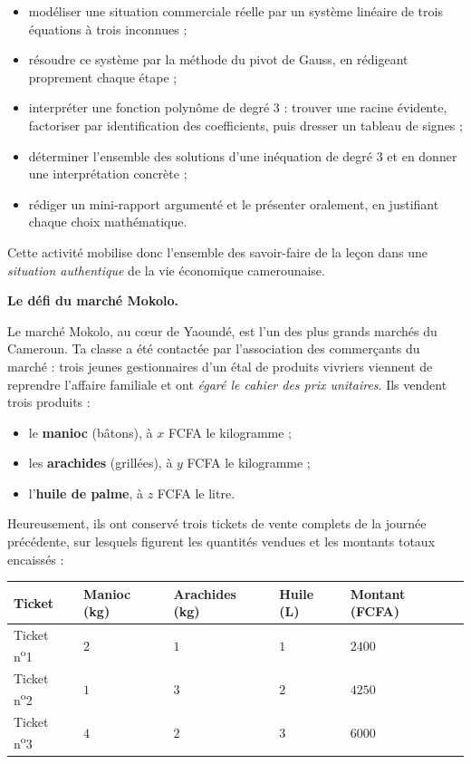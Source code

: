 \documentclass[11pt]{article}
\newcommand{\cle}[1]{{\popxbold\color{popdark}#1}}
\newcounter{popsec}
\newcounter{popsub}
\newcommand{\courssub}[1]{%
  \stepcounter{popsub}%
  \par\vspace{9pt}\noindent{\popxbold\fontsize{11.5}{13}\selectfont\color{popink}{\color{poporange}\thepopsec.\thepopsub}\hspace{6pt}#1}\par\nopagebreak\vspace{4pt}
}
\begin{document}
\begin{itemize}
\item \cle{modéliser} une situation commerciale réelle par un système linéaire de trois équations à trois inconnues ;
\item \cle{résoudre} ce système par la méthode du \cle{pivot de Gauss}, en rédigeant proprement chaque étape ;
\item \cle{interpréter} une fonction polynôme de degré 3 : trouver une \cle{racine évidente}, \cle{factoriser} par identification des coefficients, puis dresser un \cle{tableau de signes} ;
\item déterminer l'ensemble des solutions d'une \cle{inéquation de degré 3} et en donner une \cle{interprétation concrète} ;
\item rédiger un mini-rapport argumenté et le présenter oralement, en justifiant chaque choix mathématique.
\end{itemize}

Cette activité mobilise donc l'ensemble des savoir-faire de la leçon dans une \emph{situation authentique} de la vie économique camerounaise.

\courssub{Situation}

\textbf{Le défi du marché Mokolo.}

Le marché Mokolo, au cœur de Yaoundé, est l'un des plus grands marchés du Cameroun. Ta classe a été contactée par l'association des commerçants du marché : trois jeunes gestionnaires d'un étal de produits vivriers viennent de reprendre l'affaire familiale et ont \emph{égaré le cahier des prix unitaires}. Ils vendent trois produits :

\begin{itemize}
\item le \textbf{manioc} (bâtons), à $x$ FCFA le kilogramme ;
\item les \textbf{arachides} (grillées), à $y$ FCFA le kilogramme ;
\item l'\textbf{huile de palme}, à $z$ FCFA le litre.
\end{itemize}

Heureusement, ils ont conservé trois \cle{tickets de vente} complets de la journée précédente, sur lesquels figurent les quantités vendues et les montants totaux encaissés :

\begin{center}
\begin{tabularx}{\linewidth}{|l|X|X|X|X|}
\hline
\rowcolor{popblueL} \textbf{Ticket} & \textbf{Manioc (kg)} & \textbf{Arachides (kg)} & \textbf{Huile (L)} & \textbf{Montant (FCFA)} \\
\hline
Ticket n\textsuperscript{o}1 & $2$ & $1$ & $1$ & $\num{2400}$ \\
\hline
Ticket n\textsuperscript{o}2 & $1$ & $3$ & $2$ & $\num{4250}$ \\
\hline
Ticket n\textsuperscript{o}3 & $4$ & $2$ & $3$ & $\num{6000}$ \\
\hline
\end{tabularx}
\end{center}
\end{document}
